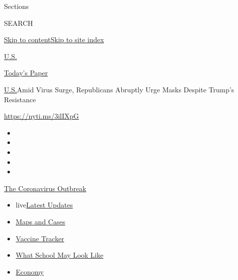 Sections

SEARCH

\protect\hyperlink{site-content}{Skip to
content}\protect\hyperlink{site-index}{Skip to site index}

\href{https://www.nytimes.com/section/us}{U.S.}

\href{https://myaccount.nytimes.com/auth/login?response_type=cookie\&client_id=vi}{}

\href{https://www.nytimes.com/section/todayspaper}{Today's Paper}

\href{/section/us}{U.S.}\textbar{}Amid Virus Surge, Republicans Abruptly
Urge Masks Despite Trump's Resistance

\url{https://nyti.ms/3ilIXpG}

\begin{itemize}
\item
\item
\item
\item
\item
\end{itemize}

\href{https://www.nytimes.com/news-event/coronavirus?action=click\&pgtype=Article\&state=default\&region=TOP_BANNER\&context=storylines_menu}{The
Coronavirus Outbreak}

\begin{itemize}
\tightlist
\item
  live\href{https://www.nytimes.com/2020/08/01/world/coronavirus-covid-19.html?action=click\&pgtype=Article\&state=default\&region=TOP_BANNER\&context=storylines_menu}{Latest
  Updates}
\item
  \href{https://www.nytimes.com/interactive/2020/us/coronavirus-us-cases.html?action=click\&pgtype=Article\&state=default\&region=TOP_BANNER\&context=storylines_menu}{Maps
  and Cases}
\item
  \href{https://www.nytimes.com/interactive/2020/science/coronavirus-vaccine-tracker.html?action=click\&pgtype=Article\&state=default\&region=TOP_BANNER\&context=storylines_menu}{Vaccine
  Tracker}
\item
  \href{https://www.nytimes.com/interactive/2020/07/29/us/schools-reopening-coronavirus.html?action=click\&pgtype=Article\&state=default\&region=TOP_BANNER\&context=storylines_menu}{What
  School May Look Like}
\item
  \href{https://www.nytimes.com/live/2020/07/31/business/stock-market-today-coronavirus?action=click\&pgtype=Article\&state=default\&region=TOP_BANNER\&context=storylines_menu}{Economy}
\end{itemize}

